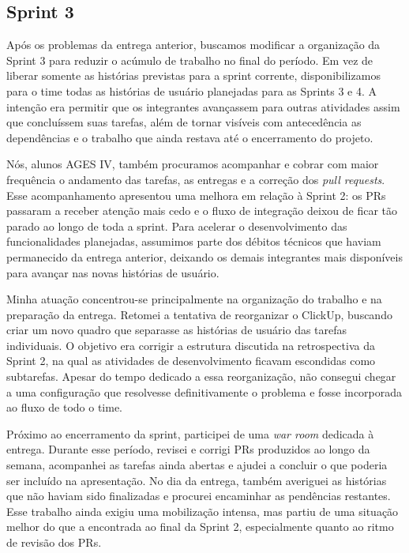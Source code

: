 \subsection{Sprint 3}

Após os problemas da entrega anterior, buscamos modificar a organização da
Sprint 3 para reduzir o acúmulo de trabalho no final do período. Em vez de
liberar somente as histórias previstas para a sprint corrente, disponibilizamos
para o time todas as histórias de usuário planejadas para as Sprints 3 e 4. A
intenção era permitir que os integrantes avançassem para outras atividades assim
que concluíssem suas tarefas, além de tornar visíveis com antecedência as
dependências e o trabalho que ainda restava até o encerramento do projeto.

Nós, alunos AGES IV, também procuramos acompanhar e cobrar com maior frequência
o andamento das tarefas, as entregas e a correção dos \textit{pull requests}.
Esse acompanhamento apresentou uma melhora em relação à Sprint 2: os PRs passaram
a receber atenção mais cedo e o fluxo de integração deixou de ficar tão parado
ao longo de toda a sprint. Para acelerar o desenvolvimento das funcionalidades
planejadas, assumimos parte dos débitos técnicos que haviam permanecido da
entrega anterior, deixando os demais integrantes mais disponíveis para avançar
nas novas histórias de usuário.

Minha atuação concentrou-se principalmente na organização do trabalho e na
preparação da entrega. Retomei a tentativa de reorganizar o ClickUp, buscando
criar um novo quadro que separasse as histórias de usuário das tarefas
individuais. O objetivo era corrigir a estrutura discutida na retrospectiva da
Sprint 2, na qual as atividades de desenvolvimento ficavam escondidas como
subtarefas. Apesar do tempo dedicado a essa reorganização, não consegui chegar a
uma configuração que resolvesse definitivamente o problema e fosse incorporada
ao fluxo de todo o time.

Próximo ao encerramento da sprint, participei de uma \textit{war room} dedicada à
entrega. Durante esse período, revisei e corrigi PRs produzidos ao longo da
semana, acompanhei as tarefas ainda abertas e ajudei a concluir o que poderia ser
incluído na apresentação. No dia da entrega, também averiguei as histórias que
não haviam sido finalizadas e procurei encaminhar as pendências restantes. Esse
trabalho ainda exigiu uma mobilização intensa, mas partiu de uma situação melhor
do que a encontrada ao final da Sprint 2, especialmente quanto ao ritmo de
revisão dos PRs.

